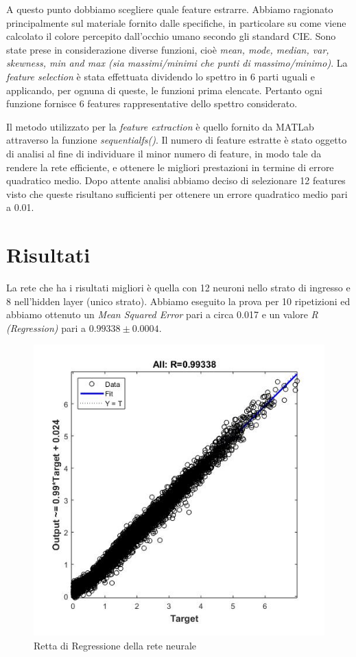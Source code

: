 A questo punto dobbiamo scegliere quale feature estrarre. Abbiamo ragionato principalmente sul materiale fornito dalle specifiche, in particolare su come viene calcolato il colore percepito dall'occhio umano secondo gli standard CIE. Sono state prese in considerazione diverse funzioni, cioè \textit{mean, mode, median, var, skewness, min and max (sia massimi/minimi che punti di massimo/minimo)}. La \textit{feature selection} è stata effettuata dividendo lo spettro in 6 parti uguali e applicando, per ognuna di queste, le funzioni prima elencate. Pertanto ogni funzione fornisce 6 features rappresentative dello spettro considerato.

Il metodo utilizzato per la \textit{feature extraction} è quello fornito da MATLab attraverso la funzione \textit{sequentialfs()}. Il numero di feature estratte è stato oggetto di analisi al fine di individuare il minor numero di feature, in modo tale da rendere la rete efficiente, e ottenere le migliori prestazioni in termine di errore quadratico medio. Dopo attente analisi abbiamo deciso di selezionare 12 features visto che queste risultano sufficienti per ottenere un errore quadratico medio pari a 0.01.

\section{Risultati}
La rete che ha i risultati migliori è quella con 12 neuroni nello strato di ingresso e 8 nell'hidden layer (unico strato). Abbiamo eseguito la prova per 10 ripetizioni ed abbiamo ottenuto un \textit{Mean Squared Error} pari a circa 0.017 e un valore \textit{R (Regression)} pari a \(0.99338 \pm 0.0004\).

\begin{figure}
\begin{center}
	\includegraphics[scale=0.7]{images/rete1-regression.jpg}
\end{center}
\caption{Retta di Regressione della rete neurale}
\end{figure}

